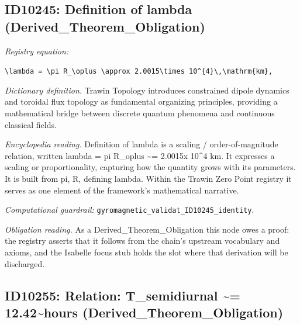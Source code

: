 \documentclass[11pt]{article}
\theoremstyle{remark}
\begin{document}
\subsection{ID10245: Definition of lambda (Derived\_Theorem\_Obligation)}

\noindent\textit{Registry equation:}\par
{\small\texttt{\textbackslash{}lambda = \textbackslash{}pi R\_\textbackslash{}oplus \textbackslash{}approx 2.0015\textbackslash{}times 10\textasciicircum{}\{4\}\textbackslash{},\textbackslash{}mathrm\{km\},}}\par\medskip
\noindent\textit{Dictionary definition.} Trawin Topology introduces constrained dipole dynamics and toroidal flux topology as fundamental organizing principles, providing a mathematical bridge between discrete quantum phenomena and continuous classical fields.\par\medskip
\noindent\textit{Encyclopedia reading.} Definition of lambda is a scaling / order-of-magnitude relation, written lambda = pi R\_oplus \textasciitilde{}= 2.0015x 10\textasciicircum{}4 km. It expresses a scaling or proportionality, capturing how the quantity grows with its parameters. It is built from pi, R, defining lambda. Within the Trawin Zero Point registry it serves as one element of the framework's mathematical narrative.
\par\medskip\noindent\textit{Computational guardrail:} \texttt{gyromagnetic\_validat\_ID10245\_identity}.
\par\medskip\noindent\textit{Obligation reading.} As a Derived\_Theorem\_Obligation this node owes a proof: the registry asserts that it follows from the chain's upstream vocabulary and axioms, and the Isabelle focus stub holds the slot where that derivation will be discharged.

\subsection{ID10255: Relation: T\_semidiurnal \textasciitilde{}= 12.42\textasciitilde{}hours (Derived\_Theorem\_Obligation)}
\end{document}
